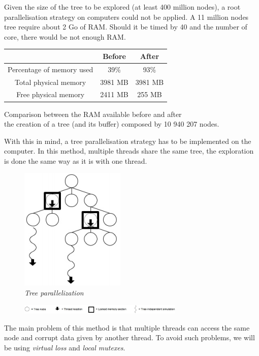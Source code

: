 Given the size of the tree to be explored (at least 400 million nodes), a root parallelisation strategy on computers could not be applied. A 11 million nodes tree require about 2 Go of RAM. Should it be timed by 40 and the number of core, there would be not enough RAM.
\bigskip
\begin{center}
	\begin{tabular}{ | c | c | c |}
		\hline  & Before & After \\ \hline
		\hline  
		Percentage of memory used & 39\% & 93\% \\
		\hline  
		Total physical memory & 3981 MB & 3981 MB \\
		\hline  
		Free physical memory & 2411 MB & 255 MB \\
		\hline
	\end{tabular}
	
	Comparison between the RAM available before and after\\the creation of a tree (and its buffer) composed by 10 940 207 nodes.
\end{center}
\bigskip

With this in mind, a tree parallelisation strategy has to be implemented on the computer. In this method, multiple threads share the same tree, the exploration is done the same way as it is with one thread.
\begin{figure}[H]
\centerline{\includegraphics[]{Parallelisation/Computer/Img/Tree.png}}
\caption{\label{fig:TreeParallelization}\textit{Tree parallelization}}
\end{figure}
\begin{figure}[H]
\centerline{\includegraphics[width=0.7\textwidth]{Parallelisation/Computer/Img/legend.png}}
\end{figure}
The main problem of this method is that multiple threads can access the same node and corrupt data given by another thread. To avoid such problems, we will be using \textit{virtual loss} and \textit{local mutexes}.

